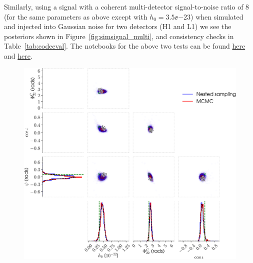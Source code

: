Similarly, using a signal with a coherent multi-detector signal-to-noise ratio of 8 (for the same parameters as above except with $h_0 = 3.5\ee{-23}$) when
simulated and injected into Gaussian noise for two detectors (H1
and L1) we see the posteriors shown in Figure~\ref{fig:simsignal_multi}, and consistency checks in Table~\ref{tab:codeeval}. The notebooks for the above two tests
can be found \href{https://github.com/mattpitkin/CW_nested_sampling_doc/blob/master/figures/codeeval/simulations/signal/SimulatedSignalTestsPaper.ipynb}{here} and 
\href{https://github.com/mattpitkin/CW_nested_sampling_doc/blob/master/figures/codeeval/simulations/signal_multidet/SimulatedSignalMultidetTestsPaper.ipynb}{here}.

\begin{figure}[!phtb]
\begin{center}
\includegraphics[width=1\columnwidth]{./figures/codeeval/simulations/signal_multidet/simulatedsignalmultitest}
\caption{ \protect}
\end{center}
\end{figure}

